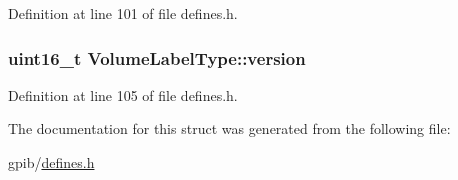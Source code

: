 Definition at line 101 of file defines.\+h.

\subsubsection[{\texorpdfstring{version}{version}}]{\setlength{\rightskip}{0pt plus 5cm}uint16\+\_\+t Volume\+Label\+Type\+::version}\hypertarget{structVolumeLabelType_a59f56fd1f28549bc625aeaaa57c8d0d2}{}\label{structVolumeLabelType_a59f56fd1f28549bc625aeaaa57c8d0d2}


Definition at line 105 of file defines.\+h.



The documentation for this struct was generated from the following file\+:\begin{DoxyCompactItemize}
\item 
gpib/\hyperlink{defines_8h}{defines.\+h}\end{DoxyCompactItemize}
